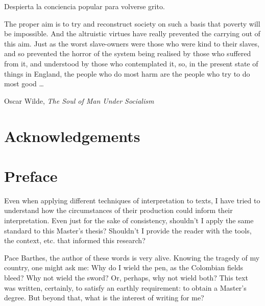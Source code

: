 \documentclass[paper=A4,portrait,twoside=true,twocolumn=false,headinclude=false,footinclude=false,fontsize=11,BCOR=15mm,DIV=calc,pagesize=auto,titlepage=firstiscover,mpinclude=true,headings=big,headings=twolinechapter,open=right,chapterprefix=false,headsepline=false,parskip=full]{scrbook}
\begin{document}
\newpage 
\vspace*{\fill}


\begin{spanish}
Despierta la conciencia popular para volverse grito.
\end{spanish}

The proper aim is to try and reconstruct society on such a basis that poverty will be impossible. And the altruistic virtues have really prevented the carrying out of this aim. Just as the worst slave-owners were those who were kind to their slaves, and so prevented the horror of the system being realised by those who suffered from it, and understood by those who contemplated it, so, in the present state of things in England, the people who do most harm are the people who try to do most good \ldots

\vspace{1\baselineskip}

\begin{FlushRight}
Oscar Wilde, \textit{The Soul of Man Under Socialism}
\end{FlushRight}

\vspace*{\fill}

\thispagestyle{empty}

\newpage 
\tableofcontents

\thispagestyle{empty}

\newpage 
\frontmatter
\pagestyle{plain}
\chapter{Acknowledgements} 

\lipsum

\chapter{Preface} 

Even when applying different techniques of interpretation to texts, I have
tried to understand how the circumstances of their production could inform
their interpretation. Even just for the sake of consistency, shouldn't I
apply the same standard to this Master's thesis? Shouldn't I provide the
reader with the tools, the context, etc. that informed this research?

Pace Barthes, the author of these words is very alive. Knowing the tragedy
of my country, one might ask me: Why do I wield the pen, as the Colombian
fields bleed? Why not wield the sword? Or, perhaps, why not wield both?
This text was written, certainly, to satisfy an earthly requirement: to
obtain a Master's degree. But beyond that, what is the interest of writing
for me?
\end{document}
